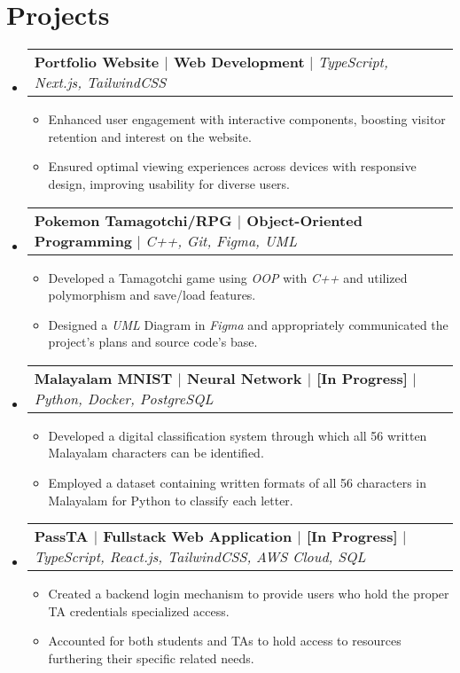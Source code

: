 \documentclass[letterpaper,11pt]{article}
\makeatletter
\newcommand{\resumeItem}[1]{
  \item\small{
    {#1 \vspace{-2pt}}
  }
}
\newcommand{\resumeProjectHeading}[2]{
    \item
    \begin{tabular*}{0.97\textwidth}{l@{\extracolsep{\fill}}r}
      \small#1 & #2 \\
    \end{tabular*}\vspace{-7pt}
}
\newcommand{\resumeSubHeadingListStart}{\begin{itemize}[leftmargin=0.15in, label={}]}
\newcommand{\resumeSubHeadingListEnd}{\end{itemize}}
\newcommand{\resumeItemListStart}{\begin{itemize}}
\newcommand{\resumeItemListEnd}{\end{itemize}\vspace{-5pt}}
\makeatother
\begin{document}
\section{Projects}
    \resumeSubHeadingListStart
    
    \resumeProjectHeading
          {\textbf{Portfolio Website $|$ Web Development} $|$ \emph{TypeScript, Next.js, TailwindCSS}}{}
          \resumeItemListStart
            \resumeItem{Enhanced user engagement with interactive components, boosting visitor retention and interest on the website.}
            \resumeItem{Ensured optimal viewing experiences across devices with responsive design, improving usability for diverse users.}
          \resumeItemListEnd
          
    \resumeProjectHeading
          {\textbf{Pokemon Tamagotchi/RPG $|$ Object-Oriented Programming } $|$ \emph{C++, Git, Figma, UML}}{}
          \resumeItemListStart
            \resumeItem{Developed a Tamagotchi game using \textit{OOP} with \textit{C++} and utilized polymorphism and save/load features.}
            \resumeItem{Designed a \textit{UML} Diagram in \textit{Figma} and appropriately communicated the project's plans and source code's base.}
          \resumeItemListEnd
          
      \resumeProjectHeading
          {\textbf{Malayalam MNIST $|$ Neural Network $|$ [In Progress]} $|$ \emph{Python, Docker, PostgreSQL}}{}
          \resumeItemListStart
            \resumeItem{Developed a digital classification system through which all 56 written Malayalam characters can be identified.}
            \resumeItem{Employed a dataset containing written formats of all 56 characters in Malayalam for Python to classify each letter.}
          \resumeItemListEnd

        \resumeProjectHeading
          {\textbf{PassTA $|$ Fullstack Web Application $|$ [In Progress]} $|$ \emph{TypeScript, React.js, TailwindCSS, AWS Cloud, SQL}}{}
          \resumeItemListStart
            \resumeItem{Created a backend login mechanism to provide users who hold the proper TA credentials specialized access.}
            \resumeItem{Accounted for both students and TAs to hold access to resources furthering their specific related needs.}
          \resumeItemListEnd
          
    \resumeSubHeadingListEnd

    
\end{document}

